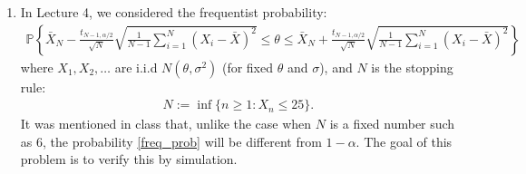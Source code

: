 \documentclass{scrartcl}
\renewcommand{\P}{{\mathbb P}}
\begin{document}
\begin{enumerate}
\begin{enumerate}
    \begin{align}\label{chi_square}
      \frac{1}{\sigma^2} \sum_{i=1}^n(x_i - \bar{x})^2 \mid
      \text{data} \sim \chi^2_{n-1}. 
    \end{align}
  On this basis, comment on whether $\hat{\sigma} = \sqrt{\sum_{i=1}^n (x_i -
      \bar{x})^2/(n-1)}$ is a reasonable point estimate of $\sigma$
    (\textbf{2 + 1 = 3 points}).
  \item Using \eqref{chi_square}, derive a $100(1-\alpha)\%$ Bayesian
    credible interval for $\sigma$ for fixed $\alpha$. (\textbf{2
      points}).
  \item Suppose $n = 6$ and $x_1 = 26.6, x_2 = 38.5, x_3 = 34.4,
  x_4 = 34, x_5 = 31, x_6 = 23.6$. Explicitly calculate the $95\%$
  credible interval for $\sigma$. (\textbf{2 points}). 
  \end{enumerate}

\item In Lecture 4, we considered the frequentist probability: 
  \begin{align}\label{freq_prob}
    \P\left\{\bar{X}_N -     \frac{t_{N-1,
    \alpha/2}}{\sqrt{N}}\sqrt{\frac{1}{N-1} \sum_{i=1}^N(X_i -
    \bar{X})^2} \leq \theta \leq \bar{X}_N +     \frac{t_{N-1,
    \alpha/2}}{\sqrt{N}}\sqrt{\frac{1}{N-1} \sum_{i=1}^N(X_i -
    \bar{X})^2} 
\right\}
  \end{align}
  where $X_1, X_2, \dots$ are i.i.d $N(\theta, \sigma^2)$ (for fixed
  $\theta$ and $\sigma$), and $N$ is the stopping rule:
  \begin{align}\label{Nstop}
    N := \inf\{n \geq 1 : X_n \leq 25\}. 
  \end{align}
  It was mentioned in class that, unlike the case when $N$ is a fixed number such as
  6, the probability \eqref{freq_prob} will be different from $1 -
  \alpha$. The goal of this problem is to verify this by simulation.


\end{enumerate}
\end{document}
